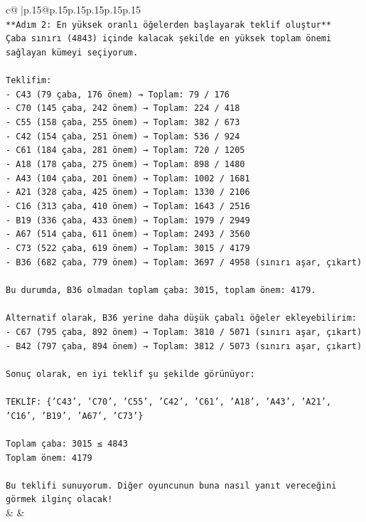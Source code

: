 \documentclass{article}
\begin{document}
{\begin{supertabular}{c@{$\;$}|p{.15\linewidth}@{}p{.15\linewidth}p{.15\linewidth}p{.15\linewidth}p{.15\linewidth}p{.15\linewidth}}
{{{\\ 
\texttt{**Adım 2: En yüksek oranlı öğelerden başlayarak teklif oluştur**} \\
\texttt{Çaba sınırı (4843) içinde kalacak şekilde en yüksek toplam önemi sağlayan kümeyi seçiyorum.} \\
\\ 
\texttt{Teklifim:} \\
\texttt{{-} C43 (79 çaba, 176 önem) → Toplam: 79 / 176} \\
\texttt{{-} C70 (145 çaba, 242 önem) → Toplam: 224 / 418} \\
\texttt{{-} C55 (158 çaba, 255 önem) → Toplam: 382 / 673} \\
\texttt{{-} C42 (154 çaba, 251 önem) → Toplam: 536 / 924} \\
\texttt{{-} C61 (184 çaba, 281 önem) → Toplam: 720 / 1205} \\
\texttt{{-} A18 (178 çaba, 275 önem) → Toplam: 898 / 1480} \\
\texttt{{-} A43 (104 çaba, 201 önem) → Toplam: 1002 / 1681} \\
\texttt{{-} A21 (328 çaba, 425 önem) → Toplam: 1330 / 2106} \\
\texttt{{-} C16 (313 çaba, 410 önem) → Toplam: 1643 / 2516} \\
\texttt{{-} B19 (336 çaba, 433 önem) → Toplam: 1979 / 2949} \\
\texttt{{-} A67 (514 çaba, 611 önem) → Toplam: 2493 / 3560} \\
\texttt{{-} C73 (522 çaba, 619 önem) → Toplam: 3015 / 4179} \\
\texttt{{-} B36 (682 çaba, 779 önem) → Toplam: 3697 / 4958 (sınırı aşar, çıkart)} \\
\\ 
\texttt{Bu durumda, B36 olmadan toplam çaba: 3015, toplam önem: 4179.} \\
\\ 
\texttt{Alternatif olarak, B36 yerine daha düşük çabalı öğeler ekleyebilirim:} \\
\texttt{{-} C67 (795 çaba, 892 önem) → Toplam: 3810 / 5071 (sınırı aşar, çıkart)} \\
\texttt{{-} B42 (797 çaba, 894 önem) → Toplam: 3812 / 5073 (sınırı aşar, çıkart)} \\
\\ 
\texttt{Sonuç olarak, en iyi teklif şu şekilde görünüyor:} \\
\\ 
\texttt{TEKLİF: \{'C43', 'C70', 'C55', 'C42', 'C61', 'A18', 'A43', 'A21', 'C16', 'B19', 'A67', 'C73'\}} \\
\\ 
\texttt{Toplam çaba: 3015 ≤ 4843} \\
\texttt{Toplam önem: 4179} \\
\\ 
\texttt{Bu teklifi sunuyorum. Diğer oyuncunun buna nasıl yanıt vereceğini görmek ilginç olacak!} \\
            }
        }
    }
    & & \\ \\


\end{supertabular}}
\end{document}
